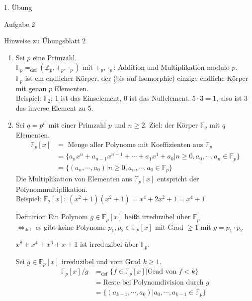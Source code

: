 \begin{section}{1. Übung}
\begin{subsection}{Aufgabe 2}
  \end{subsection}
  
  \begin{subsection}{Hinweise zu Übungsblatt 2}
   \begin{enumerate}
    \item Sei $p$ eine Primzahl.\\
    $\mathbb{F}_p =_{\text{def}} (\mathbb{Z}_p, +_p, \cdot_p)$ mit $+_p, \cdot_p$: Addition und Multiplikation modulo $p$. \\
    $\mathbb{F}_p$ ist ein endlicher Körper, der (bis auf Isomorphie) einzige endliche Körper mit genau $p$ Elementen. \\
    Beispiel: $\mathbb{F}_2$: 1 ist das Einselement, 0 ist das Nullelement. $5\cdot3=1$, also ist 3 das inverse Element zu 5.
    \item Sei $q = p^n$ mit einer Primzahl $p$ und $ n \geq 2$. Ziel: der Körper $\mathbb{F}_q$ mit $q$ Elementen. \\
    \begin{align*}
    \mathbb{F}_p[x] & = \text{ Menge aller Polynome mit Koeffizienten aus }\mathbb{F}_p \\
    & = \{a_nx^n + a_{n-1}x^{n-1}+\cdots+a_1x^1+a_0 | n \geq 0, a_0,\cdots,a_n \in \mathbb{F}_p\} \\
    & = \{(a_n,\cdots,a_0)|n \geq 0, a_n,\cdots,a_0 \in \mathbb{F}_p\}
    \end{align*}
    Die Multiplikation von Elementen aus $\mathbb{F}_p[x]$ entspricht der Polynommultiplikation. \\
    Beispiel: $\mathbb{F}_2[x]$: $(x^2+1)(x^2+1) = x^4 + 2x^2+1 = x^4+1$

    \begin{subsection}{Definition}
      Ein Polynom $g \in \mathbb{F}_p[x]$ heißt \underline{irreduzibel} über $\mathbb{F}_p$ \\
      $\Leftrightarrow_\text{def}$ es gibt keine Polynome $p_1, p_2 \in \mathbb{F}_p[x]$ mit Grad $ \geq 1$ mit $g=p_1\cdot p_2$
    \end{subsection}
    \begin{satz}
      $x^8+x^4+x^3+x+1$ ist irreduzibel über $\mathbb{F}_p$.
    \end{satz}
    
    \begin{definition}
      Sei $g \in \mathbb{F}_p[x]$ irreduzibel und vom Grad $k \geq 1$. \\
      \begin{align*}
       \mathbb{F}_p[x] / g & =_\text{def} \{f \in \mathbb{F}_p[x] | \text{Grad von } f < k\} \\
       & = \text{Reste bei Polynomdivision durch }g \\
       & = \{(a_{k-1}, \cdots, a_0) | a_0, \cdots, a_{k-1} \in \mathbb{F}_p\}
      \end{align*}
    \end{definition}


\end{enumerate}
\end{subsection}
\end{section}
